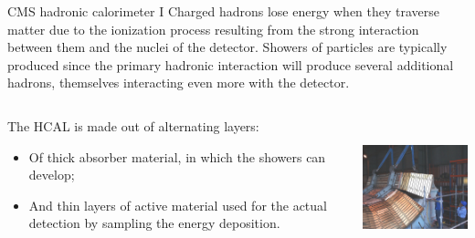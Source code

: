 \documentclass[8pt]{beamer}
\begin{document}
\begin{frame}{CMS hadronic calorimeter I}
\justifying
\vspace{10pt}
Charged hadrons lose energy when they traverse matter due to the ionization process resulting from the strong interaction between them and the nuclei of the detector. \vfill
Showers of particles are typically produced since the primary hadronic interaction will produce several additional hadrons, themselves interacting even more with the detector. \vfill

\begin{columns}
	\begin{column}{0.52 \textwidth}
The HCAL is made out of alternating layers:
\vspace{-10pt}
\begin{itemize}
\justifying
\item Of thick \alert{absorber material}, in which the showers can develop;
\item And thin layers of \alert{active material} used for the actual detection by sampling the energy deposition.
\end{itemize}
\end{column}
	\begin{column}{0.45 \textwidth}
	\begin{center}
\includegraphics[width=5.2cm, height=4cm]{figs/CMSHcal.jpg}
\end{center}
	\end{column}
	\end{columns} \vfill
\end{frame}
\end{document}
